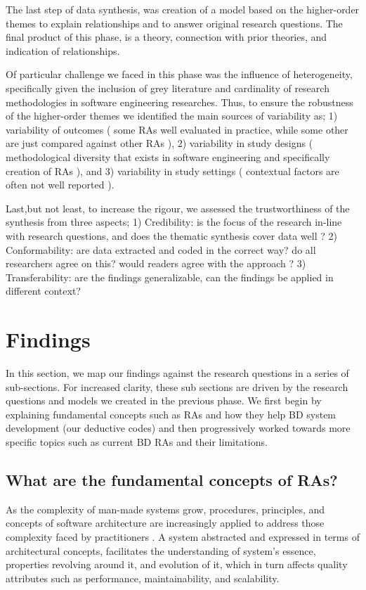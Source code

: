 \documentclass{ieeeaccess}
\begin{document}
The last step of data synthesis, was creation of a model based on the higher-order themes to explain relationships and to answer original research questions. The final product of this phase, is a theory, connection with prior theories, and indication of relationships. 

Of particular challenge we faced in this phase was the influence of heterogeneity, specifically given the inclusion of grey literature and cardinality of research methodologies in software engineering researches. Thus, to ensure the robustness of the higher-order themes we identified the main sources of variability as; 1) variability of outcomes ( some RAs well evaluated in practice, while some other are just compared against other RAs ), 2) variability in study designs ( methodological diversity that exists in software engineering and specifically creation of RAs ), and 3) variability in study settings ( contextual factors are often not well reported ).

Last,but not least, to increase the rigour, we assessed the trustworthiness of the synthesis from three aspects; 1) Credibility: is the focus of the research in-line with research questions, and does the thematic synthesis cover data well ? 2) Conformability: are data extracted and coded in the correct way? do all researchers agree on this? would readers agree with the approach ? 3) Transferability: are the findings generalizable, can the findings be applied in different context? 

\section{Findings}

In this section, we map our findings against the research questions in a series of sub-sections. For increased clarity, these sub sections are driven by the research questions and models we created in the previous phase. We first begin by explaining fundamental concepts such as RAs and how they help BD system development (our deductive codes) and then progressively worked towards more specific topics such as current BD RAs and their limitations.

\subsection{What are the fundamental concepts of RAs?}

As the complexity of man-made systems grow, procedures, principles, and concepts of software architecture are increasingly applied to address those complexity faced by practitioners \cite{AtaeiACIS}. A system abstracted and expressed in terms of architectural concepts, facilitates the understanding of system’s essence, properties revolving around it, and evolution of it, which in turn affects quality attributes such as performance, maintainability, and scalability. 
\end{document}
